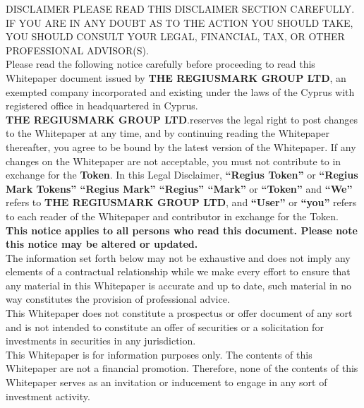 \documentclass[12pt,a4paper]{article}
\begin{document}
  DISCLAIMER PLEASE READ THIS DISCLAIMER SECTION CAREFULLY. IF YOU ARE IN ANY
  DOUBT AS TO THE ACTION YOU SHOULD TAKE, YOU SHOULD CONSULT YOUR LEGAL,
  FINANCIAL, TAX, OR OTHER PROFESSIONAL ADVISOR(S).\\ %

  Please read the following notice carefully before proceeding to read this
  Whitepaper document issued by \textbf{THE REGIUSMARK GROUP LTD}, an exempted
  company incorporated and existing under the laws of the Cyprus with registered
  office in headquartered in Cyprus.\\

  \textbf{THE REGIUSMARK GROUP LTD}.reserves the legal right to post changes to
  the Whitepaper at any time, and by continuing reading the Whitepaper
  thereafter, you agree to be bound by the latest version of the Whitepaper. If
  any changes on the Whitepaper are not acceptable, you must not contribute to
  in exchange for the \textbf{Token}. In this Legal Disclaimer, \textbf{``Regius
  Token''} or \textbf{``Regius Mark Tokens'' ``Regius Mark'' ``Regius''
  ``Mark''} or \textbf{``Token''} and \textbf{``We''} refers to \textbf{THE
  REGIUSMARK GROUP LTD}, and \textbf{``User''} or
  \textbf{``you''} refers to each reader of the Whitepaper and contributor in
  exchange for the Token.\\

  \textbf{This notice applies to all persons who read this document. Please note
  this notice may be altered or updated.}\\

  The information set forth below may not be exhaustive and does not imply any
  elements of a contractual relationship while we make every effort to ensure
  that any material in this Whitepaper is accurate and up to date, such material
  in no way constitutes the provision of professional advice.\\

  This Whitepaper does not constitute a prospectus or offer document of any sort
  and is not intended to constitute an offer of securities or a solicitation for
  investments in securities in any jurisdiction.\\

  This Whitepaper is for information purposes only. The contents of this
  Whitepaper are not a financial promotion. Therefore, none of the contents of
  this Whitepaper serves as an invitation or inducement to engage in any sort of
  investment activity.\\
\end{document}
